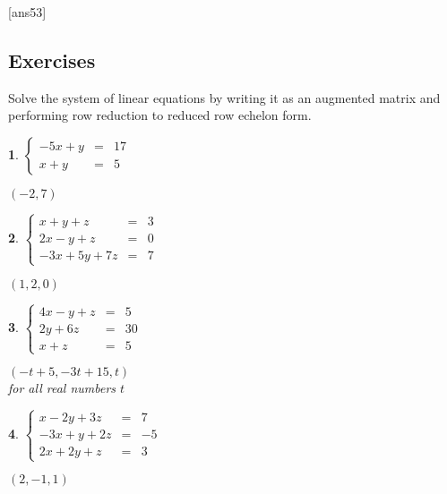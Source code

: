 \documentclass{amsbook}
\newtheorem{exc}{}
\newenvironment{ex}{\begin{exc}\normalfont}{\end{exc}}
\numberwithin{section}{chapter}
\numberwithin{equation}{chapter}
\begin{document}
[ans53]
\subsection*{Exercises \nopunct} \hfill

Solve the system of linear equations by writing it as an augmented matrix and performing row reduction to reduced row echelon form.

\begin{multicols}{2}

\begin{ex}
	$\left\{ \begin{array}{rcr} -5x + y & = & 17  \\ x + y & = & 5  \end{array} \right.$
	\begin{sol}
		 $(-2, 7)$
	\end{sol}
\end{ex}

\begin{ex}
	$\left\{ \begin{array}{rcr} x + y + z & = & 3 \\ 2x - y + z & = & 0 \\ -3x + 5y + 7z & = & 7  \end{array} \right.$
	\begin{sol}
		 $(1, 2, 0)$
	\end{sol}
\end{ex}

\begin{ex}
	 $\left\{ \begin{array}{rcr} 4x - y + z & = & 5 \\ 2y + 6z & = & 30 \\ x + z & = & 5  \end{array} \right.$
	\begin{sol}
	$(-t + 5, -3t + 15, t)$\\
	for all real numbers $t$
	\end{sol}
\end{ex}

\begin{ex}
	 $\left\{ \begin{array}{rcr} x-2y+3z & = & 7 \\ -3x+y+2z & = & -5 \\ 2x+2y+z & = & 3  \end{array} \right.$
	\begin{sol}
		$(2,-1,1)$
	\end{sol}
\end{ex}



\end{multicols}
\end{document}
